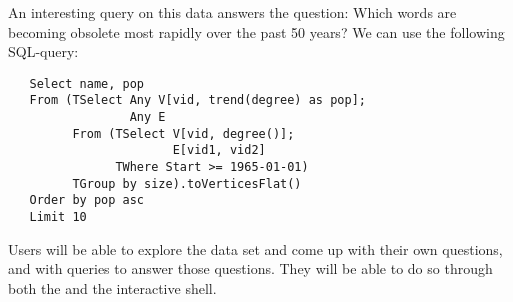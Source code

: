 An interesting query on this data answers the question: Which words
are becoming obsolete most rapidly over the past 50 years?  We can use
the following SQL-\ql query:

\begin{small}
\begin{verbatim}
   Select name, pop
   From (TSelect Any V[vid, trend(degree) as pop];
                 Any E
         From (TSelect V[vid, degree()]; 
                       E[vid1, vid2]
               TWhere Start >= 1965-01-01)
         TGroup by size).toVerticesFlat()
   Order by pop asc
   Limit 10
\end{verbatim}
\end{small}

Users will be able to explore the data set and come up with their own
questions, and with queries to answer those questions.  They will be
able to do so through both the \qlui and the interactive shell.


